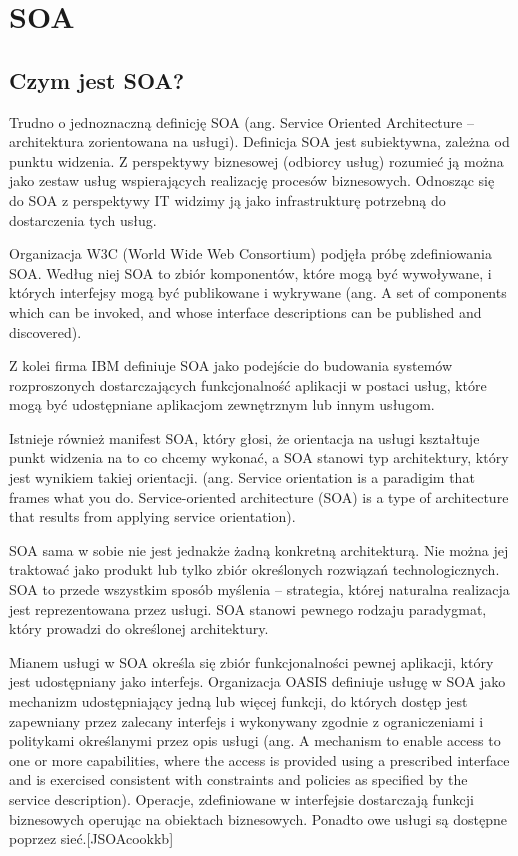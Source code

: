 \section{SOA}
\subsection{Czym jest SOA?}
Trudno o jednoznaczną definicję SOA (ang. Service Oriented Architecture – architektura zorientowana na usługi). Definicja SOA jest subiektywna, zależna od punktu widzenia. Z perspektywy biznesowej (odbiorcy usług) rozumieć ją można jako zestaw usług wspierających realizację procesów biznesowych. Odnosząc się do SOA z perspektywy IT widzimy ją jako infrastrukturę potrzebną do dostarczenia tych usług.
	
Organizacja W3C (World Wide Web Consortium) podjęła próbę zdefiniowania SOA. Według niej SOA to zbiór komponentów, które mogą być wywoływane, i których interfejsy mogą być publikowane i wykrywane (ang. A set of components which can be invoked, and whose interface descriptions can be published and discovered).

Z kolei firma IBM definiuje SOA jako podejście do budowania systemów rozproszonych dostarczających funkcjonalność aplikacji w postaci usług, które mogą być udostępniane aplikacjom zewnętrznym lub innym usługom. \cite{PlatIntGor}

Istnieje również manifest SOA, który głosi, że orientacja na usługi kształtuje punkt widzenia na to co chcemy wykonać, a SOA stanowi typ architektury, który jest wynikiem takiej orientacji. (ang. Service orientation is a paradigim that frames what you do. Service-oriented architecture (SOA) is a type of architecture that results from applying service orientation). \cite{SOAManifestoOrg}

SOA sama w sobie nie jest jednakże żadną konkretną architekturą. Nie można jej traktować jako produkt lub tylko zbiór określonych rozwiązań technologicznych. SOA to przede wszystkim sposób myślenia – strategia, której naturalna realizacja jest reprezentowana przez usługi. \cite{SOAsdj102009,SOAwJBBC} SOA stanowi pewnego rodzaju paradygmat, który prowadzi do określonej architektury. \cite{SOAsdj102009}
	
Mianem usługi w SOA określa się zbiór funkcjonalności pewnej aplikacji, który jest udostępniany jako interfejs. \cite{SOAawidptas} Organizacja OASIS definiuje usługę w SOA jako mechanizm udostępniający jedną lub więcej funkcji, do których dostęp jest zapewniany przez zalecany interfejs i wykonywany zgodnie z ograniczeniami i politykami określanymi przez opis usługi (ang. A mechanism to enable access to one or more capabilities, where the access is provided using a prescribed interface and is exercised consistent with constraints and policies as specified by the service description). Operacje, zdefiniowane w interfejsie dostarczają funkcji biznesowych operując na obiektach biznesowych. Ponadto owe usługi są dostępne poprzez sieć.[JSOAcookkb] 

